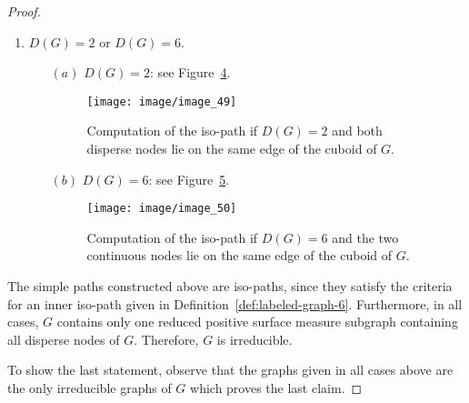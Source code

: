 \documentclass[a4paper,11pt]{article}
\begin{document}
\begin{proof}
\begin{enumerate}
\begin{itemize}
\begin{figure}[!ht]
\vspace{0.2cm}
$(c3)$
\begin{tabular}[c]{l}
\texttt{[image: image/image\_46]}
\end{tabular}
\caption{Computation of the iso-path if $D(G)=4$ and $L(G)=\emptyset$ in three different cases as shown by
the sketches (c1), (c2) and (c3).}
\label{image_44_45_46}
\end{figure}
\FloatBarrier
\item[$(d)$] $D(G)=5$: see Figure~\ref{image_47}.
\begin{figure}[!ht]
\texttt{[image: image/image\_47]}
\caption{Computation of the iso-path if $D(G)=5$
and $L(G)=\emptyset$.}
\label{image_47}
\end{figure}
\FloatBarrier
\item[$(e)$] $D(G)=7$: see Figure~\ref{image_48}.
\begin{figure}[!ht]
\texttt{[image: image/image\_48]}
\caption{Computation of the iso-path if $D(G)=7$.}
\label{image_48}
\end{figure}
\FloatBarrier
\end{itemize}
\item $D(G)=2$ or $D(G)=6$.
\begin{itemize}
\item[$(a)$] $D(G)=2$: see Figure~\ref{image_49}.
\begin{figure}[!ht]
\texttt{[image: image/image\_49]}
\caption{Computation of the iso-path if $D(G)=2$ and both disperse nodes lie on the same edge of the
cuboid of $G$.}
\label{image_49}
\end{figure}
\FloatBarrier
\item[$(b)$] $D(G)=6$: see Figure~\ref{image_50}.
\begin{figure}[!ht]
\texttt{[image: image/image\_50]}
\caption{Computation of the iso-path if $D(G)=6$ and the two continuous nodes lie on the same edge of
the cuboid of $G$.}
\label{image_50}
\end{figure}
\FloatBarrier
\end{itemize}
\end{enumerate}
The simple paths constructed above are iso-paths, since they satisfy the criteria for an
inner iso-path given in Definition~\ref{def:labeled-graph-6}. Furthermore, in all cases,
$G$ contains only one reduced positive surface measure subgraph containing all disperse nodes of
$G$. Therefore, $G$ is irreducible.

To show the last statement, observe that the graphs given in all cases above are the only irreducible
graphs of $G$ which proves the last claim.
\end{proof}
\end{document}
